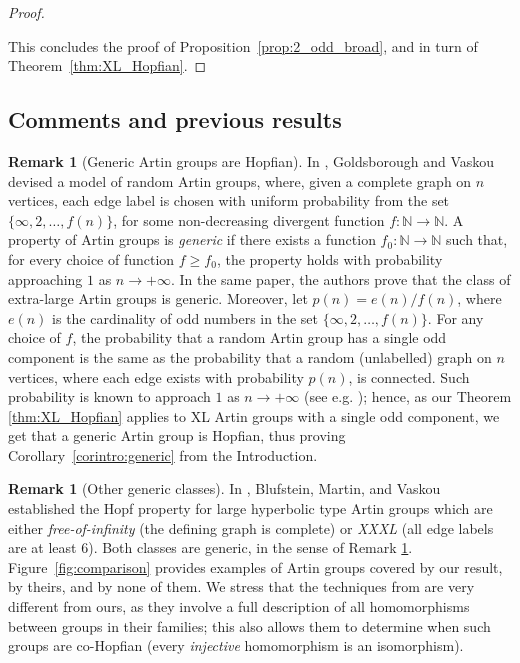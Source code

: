 \documentclass[svgnames]{amsart}
\theoremstyle{plain}
\theoremstyle{definition}
\newtheorem{rem}[thm]{Remark}
\begin{document}
\begin{proof}
\begin{itemize}
    \end{itemize}
This concludes the proof of Proposition~\ref{prop:2_odd_broad}, and in turn of Theorem~\ref{thm:XL_Hopfian}. \end{proof}

\subsection{Comments and previous results}
\begin{rem}[Generic Artin groups are Hopfian]\label{rem:generic_artin}
In \cite{GV_random}, Goldsborough and Vaskou devised a model of random Artin groups, where, given a complete graph on $n$ vertices, each edge label is chosen with uniform probability from the set $\{\infty, 2, \ldots, f(n)\}$, for some non-decreasing divergent function $f\colon \mathbb{N}\to \mathbb{N}$. A property of Artin groups is \emph{generic} if there exists a function $f_0\colon \mathbb{N}\to \mathbb{N}$ such that, for every choice of function $f\ge f_0$, the property holds with probability approaching $1$ as $n\to +\infty$. In the same paper, the authors prove that the class of extra-large Artin groups is generic. Moreover, let $p(n)=e(n)/f(n)$, where $e(n)$ is the cardinality of odd numbers in the set $\{\infty, 2, \ldots, f(n)\}$. For any choice of $f$, the probability that a random Artin group has a single odd component is the same as the probability that a random (unlabelled) graph on $n$ vertices, where each edge exists with probability $p(n)$, is connected. Such probability is known to approach $1$ as $n\to +\infty$ (see e.g. \cite{erdosrenyi}); hence, as our Theorem \ref{thm:XL_Hopfian} applies to XL Artin groups with a single odd component, we get that a generic Artin group is Hopfian, thus proving Corollary~\ref{corintro:generic} from the Introduction.
\end{rem}

\begin{rem}[Other generic classes]\label{rem:bmv}
   In \cite{BMV}, Blufstein, Martin, and Vaskou established the Hopf property for large hyperbolic type Artin groups which are either \emph{free-of-infinity} (the defining graph is complete) or \emph{XXXL} (all edge labels are at least 6). Both classes are generic, in the sense of Remark \ref{rem:generic_artin}. Figure~\ref{fig:comparison} provides examples of Artin groups covered by our result, by theirs, and by none of them. We stress that the techniques from \cite{BMV} are very different from ours, as they involve a full description of all homomorphisms between groups in their families; this also allows them to determine when such groups are co-Hopfian (every \emph{injective} homomorphism is an isomorphism).
\end{rem}
\end{document}
